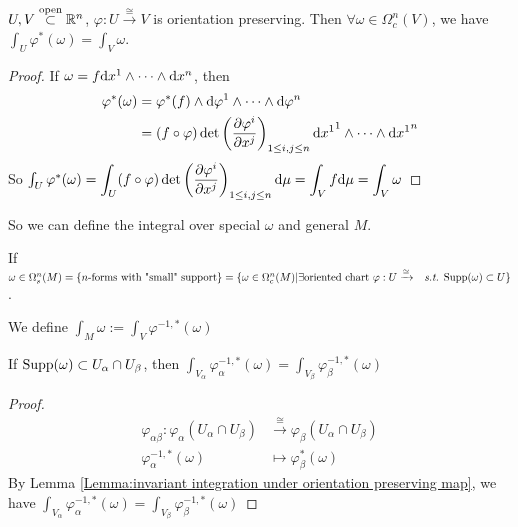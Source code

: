 \begin{lemma}\label{Lemma:invariant integration under orientation preserving map}
     $ U,V\overset{\text{open}}{\subset}\mathbb R^n $, $ \varphi:U\xrightarrow{\cong}V $ is orientation preserving. Then  $ \forall \omega\in \Omega_c^n(V) $, we have  $ \int_U\varphi^*(\omega)=\int_V\omega $.    
\end{lemma}
\begin{proof}
    If $ \omega=f\mathrm{d} {x}^1\wedge\cdots\wedge\mathrm{d} {x}^n $, then 
    \begin{equation}
        \begin{aligned}
            \varphi^*(\omega)&=\varphi^*(f)\wedge\mathrm{d} {\varphi}^1\wedge\cdots\wedge\mathrm{d} {\varphi}^n\\
            &=(f\circ\varphi)\det\left(\frac{\partial \varphi^i}{\partial x^j}\right)_{1 \leq i,j \leq n}\mathrm{d} {x^1}^1\wedge\cdots\wedge\mathrm{d} {x^1}^n
        \end{aligned}
    \end{equation}
    So  $ \int_U\varphi^*(\omega)=\displaystyle\int_U (f\circ\varphi)\det\left(\frac{\partial \varphi^i}{\partial x^j}\right)_{1 \leq i,j \leq n}\mathrm{d} \mu=\int_Vf\mathrm{d} \mu=\int_V\omega$ 
      
\end{proof}
So we can define the integral over special  $ \omega $ and  general  $ M $.
\begin{definition}
    If  $ \omega\in\name{$ \Omega_s^n(M) $}=\{\text{$ n $-forms with "small" support}\}\\= \{\omega\in\Omega_c^n(M)|\exists\text{oriented chart  $ \varphi:U\xrightarrow{ \cong} $ \st }\Supp(\omega)\subset U\} $.
    
    We define  $ \int_M\omega:=\int_V\varphi^{-1,*}(\omega) $ 
\end{definition} 
\begin{claim}
    If  $ \mathrm{Supp}(\omega)\subset U_\alpha\cap U_\beta $, then  $ \int_{V_\alpha}\varphi_\alpha^{-1,*}(\omega)=\int_{V_\beta}\varphi_\beta^{-1,*}(\omega) $  
\end{claim}
\begin{proof}
    \begin{align*}
        \varphi_{\alpha\beta}:\varphi_\alpha(U_\alpha\cap U_\beta)&\xrightarrow{\cong}\varphi_\beta(U_\alpha\cap U_\beta)\\
        \varphi_\alpha^{-1,*}(\omega)&\mapsto \varphi_\beta^*(\omega)
    \end{align*}
    By Lemma \ref{Lemma:invariant integration under orientation preserving map}, we have  $ \int_{V_\alpha}\varphi_\alpha^{-1,*}(\omega)=\int_{V_\beta}\varphi_\beta^{-1,*}(\omega) $ 
\end{proof}
